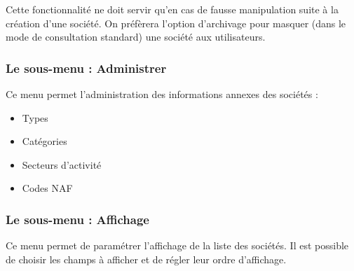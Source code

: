 Cette fonctionnalité ne doit servir qu'en cas de fausse manipulation suite à la création d'une société. On préfèrera l'option d'archivage pour masquer (dans le mode de consultation standard) une société aux utilisateurs.


\subsubsection{Le sous-menu : Administrer}

Ce menu permet l'administration des informations annexes des sociétés :\\

\begin{itemize}
\item Types
\item Catégories
\item Secteurs d'activité
\item Codes NAF
\end{itemize}

\subsubsection{Le sous-menu : Affichage}

Ce menu permet de paramétrer l'affichage de la liste des sociétés. Il est possible de choisir les champs à afficher et de régler leur ordre d'affichage.
